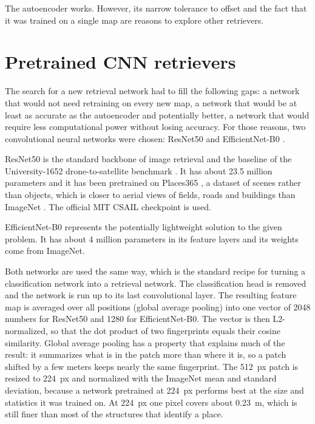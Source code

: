 \documentclass[english, Lau, oneside]{sapthesis}%
\begin{document}
The autoencoder works. However, its narrow tolerance to offset and the fact that it was trained on a single map are reasons to explore other retrievers.

\section{Pretrained CNN retrievers}
\label{sec:reloc-cnn}
The search for a new retrieval network had to fill the following gaps: a network that would not need retraining on every new map, a network that would be at least as accurate as the autoencoder and potentially better, a network that would require less computational power without losing accuracy. For those reasons, two convolutional neural networks were chosen: ResNet50 \citep{he2016resnet} and EfficientNet-B0 \citep{tan2019efficientnet}.

ResNet50 is the standard backbone of image retrieval and the baseline of the University-1652 drone-to-satellite benchmark \citep{zheng2020university}. It has about 23.5 million parameters and it has been pretrained on Places365 \citep{zhou2018places}, a dataset of scenes rather than objects, which is closer to aerial views of fields, roads and buildings than ImageNet \citep{deng2009imagenet}. The official MIT CSAIL checkpoint is used.

EfficientNet-B0 represents the potentially lightweight solution to the given problem. It has about 4 million parameters in its feature layers and its weights come from ImageNet.

Both networks are used the same way, which is the standard recipe for turning a classification network into a retrieval network. The classification head is removed and the network is run up to its last convolutional layer. The resulting feature map is averaged over all positions (global average pooling) into one vector of 2048 numbers for ResNet50 and 1280 for EfficientNet-B0. The vector is then L2-normalized, so that the dot product of two fingerprints equals their cosine similarity. Global average pooling has a property that explains much of the result: it summarizes what is in the patch more than where it is, so a patch shifted by a few meters keeps nearly the same fingerprint. The 512~px patch is resized to 224~px and normalized with the ImageNet mean and standard deviation, because a network pretrained at 224~px performs best at the size and statistics it was trained on. At 224~px one pixel covers about 0.23~m, which is still finer than most of the structures that identify a place.
\end{document}
